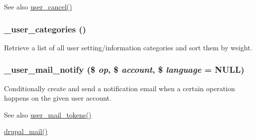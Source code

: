 \begin{DoxySeeAlso}{See also}
\hyperlink{user_8module_af6ef747e6353edaecc43f55dc85eff9e}{user\_\-cancel()} 
\end{DoxySeeAlso}
\hypertarget{user_8module_a92dbc7c3bb262cecba5f28bbf93a5175}{
\subsubsection[{\_\-user\_\-categories}]{\setlength{\rightskip}{0pt plus 5cm}\_\-user\_\-categories ()}}
\label{user_8module_a92dbc7c3bb262cecba5f28bbf93a5175}
Retrieve a list of all user setting/information categories and sort them by weight. \hypertarget{user_8module_a97bde917b48465820689f7d8dc437884}{
\subsubsection[{\_\-user\_\-mail\_\-notify}]{\setlength{\rightskip}{0pt plus 5cm}\_\-user\_\-mail\_\-notify (\$ {\em op}, \/  \$ {\em account}, \/  \$ {\em language} = {\ttfamily NULL})}}
\label{user_8module_a97bde917b48465820689f7d8dc437884}
Conditionally create and send a notification email when a certain operation happens on the given user account.

\begin{DoxySeeAlso}{See also}
\hyperlink{user_8module_a0685343e7877f453320a935cb2d9c5d1}{user\_\-mail\_\-tokens()} 

\hyperlink{mail_8inc_ab80781fd7273975a77cbbd13300eddbf}{drupal\_\-mail()}
\end{DoxySeeAlso}

